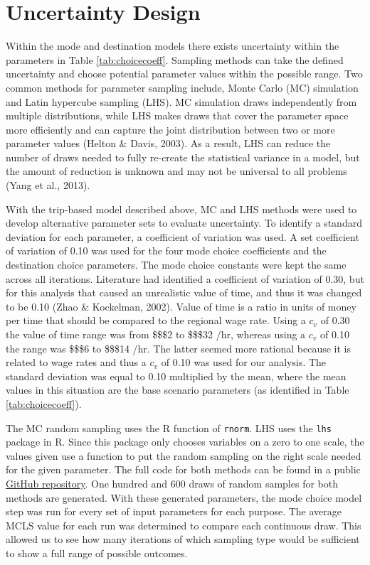 \documentclass[fancy, masters]{byuthesis}
\begin{document}
\hypertarget{uncertainty-design}{%
\section{Uncertainty Design}\label{uncertainty-design}}

Within the mode and destination models there exists uncertainty within the parameters in Table \ref{tab:choicecoeff}. Sampling methods can take the defined uncertainty and choose potential parameter values within the possible range. Two common methods for parameter sampling include, Monte Carlo (MC) simulation and Latin hypercube sampling (LHS). MC simulation draws independently from multiple distributions, while LHS makes draws that cover the parameter space more efficiently and can capture the joint distribution between two or more parameter values (Helton \& Davis, 2003). As a result, LHS can reduce the number of draws needed to fully re-create the statistical variance in a model, but the amount of reduction is unknown and may not be universal to all problems (Yang et al., 2013).

With the trip-based model described above, MC and LHS methods were used to develop alternative parameter sets to evaluate uncertainty. To identify a standard deviation for each parameter, a coefficient of variation was used. A set coefficient of variation of 0.10 was used for the four mode choice coefficients and the destination choice parameters. The mode choice constants were kept the same across all iterations. Literature had identified a coefficient of variation of 0.30, but for this analysis that caused an unrealistic value of time, and thus it was changed to be 0.10 (Zhao \& Kockelman, 2002). Value of time is a ratio in units of money per time that should be compared to the regional wage rate. Using a \(c_v\) of 0.30 the value of time range was from \$\$\$2 to \$\$\$32 /hr, whereas using a \(c_v\) of 0.10 the range was \$\$\$6 to \$\$\$14 /hr. The latter seemed more rational because it is related to wage rates and thus a \(c_v\) of 0.10 was used for our analysis. The standard deviation was equal to 0.10 multiplied by the mean, where the mean values in this situation are the base scenario parameters (as identified in Table \ref{tab:choicecoeff}).

The MC random sampling uses the R function of \texttt{rnorm}. LHS uses the \texttt{lhs} package in R. Since this package only chooses variables on a zero to one scale, the values given use a function to put the random sampling on the right scale needed for the given parameter. The full code for both methods can be found in a public \href{https://github.com/natmaegray/sensitivity_thesis}{GitHub repository}. One hundred and 600 draws of random samples for both methods are generated. With these generated parameters, the mode choice model step was run for every set of input parameters for each purpose. The average MCLS value for each run was determined to compare each continuous draw. This allowed us to see how many iterations of which sampling type would be sufficient to show a full range of possible outcomes.
\end{document}
